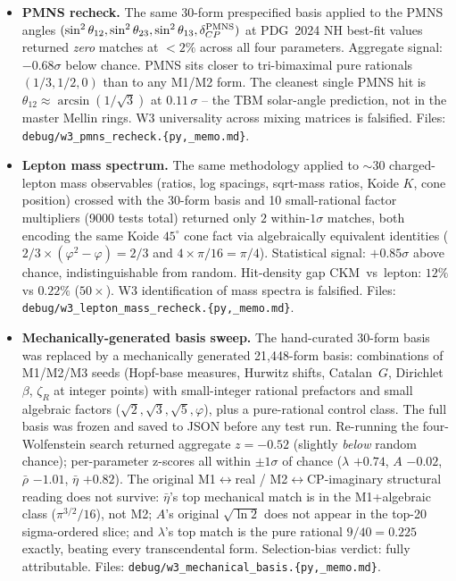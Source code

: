 \documentclass[11pt]{article}
\begin{document}
\begin{itemize}
\setlength\itemsep{2pt}
\item \textbf{PMNS recheck.}  The same 30-form prespecified basis
applied to the PMNS angles
$(\sin^2\theta_{12}, \sin^2\theta_{23}, \sin^2\theta_{13},
\delta_{CP}^{\rm PMNS})$ at PDG~2024 NH best-fit values returned
\emph{zero} matches at $<2\%$ across all four parameters.  Aggregate
signal: $-0.68\sigma$ below chance.  PMNS sits closer to tri-bimaximal
pure rationals $(1/3, 1/2, 0)$ than to any M1/M2 form.  The cleanest
single PMNS hit is $\theta_{12}\approx \arcsin(1/\sqrt{3})$ at
$0.11\,\sigma$ -- the TBM solar-angle prediction, not in the master
Mellin rings.  W3 universality across mixing matrices is falsified.
Files: \texttt{debug/w3\_pmns\_recheck.\{py,\_memo.md\}}.

\item \textbf{Lepton mass spectrum.}  The same methodology applied to
$\sim$30 charged-lepton mass observables (ratios, log spacings,
sqrt-mass ratios, Koide $K$, cone position) crossed with the 30-form
basis and 10 small-rational factor multipliers (9000 tests total)
returned only $2$ within-$1\sigma$ matches, both encoding the same
Koide $45^\circ$ cone fact via algebraically equivalent identities
($2/3 \times (\varphi^2 - \varphi) = 2/3$ and
$4 \times \pi/16 = \pi/4$).  Statistical signal: $+0.85\sigma$ above
chance, indistinguishable from random.  Hit-density gap CKM~vs~lepton:
$12\%$ vs $0.22\%$ ($50\times$).  W3 identification of mass spectra
is falsified.  Files:
\texttt{debug/w3\_lepton\_mass\_recheck.\{py,\_memo.md\}}.

\item \textbf{Mechanically-generated basis sweep.}  The hand-curated
30-form basis was replaced by a mechanically generated 21,448-form
basis: combinations of M1/M2/M3 seeds (Hopf-base measures, Hurwitz
shifts, Catalan~$G$, Dirichlet~$\beta$, $\zeta_R$ at integer points)
with small-integer rational prefactors and small algebraic factors
($\sqrt{2},\sqrt{3},\sqrt{5},\varphi$), plus a pure-rational control
class.  The full basis was frozen and saved to JSON before any test
run.  Re-running the four-Wolfenstein search returned aggregate
$z = -0.52$ (slightly \emph{below} random chance); per-parameter
z-scores all within $\pm 1\sigma$ of chance ($\lambda$ $+0.74$,
$A$ $-0.02$, $\bar\rho$ $-1.01$, $\bar\eta$ $+0.82$).  The original
M1$\leftrightarrow$real / M2$\leftrightarrow$CP-imaginary structural
reading does not survive: $\bar\eta$'s top mechanical match is in the
M1+algebraic class ($\pi^{3/2}/16$), not M2; $A$'s original
$\sqrt{\ln 2}$ does not appear in the top-20 sigma-ordered slice; and
$\lambda$'s top match is the pure rational $9/40 = 0.225$ exactly,
beating every transcendental form.  Selection-bias verdict: fully
attributable.  Files:
\texttt{debug/w3\_mechanical\_basis.\{py,\_memo.md\}}.
\end{itemize}
\end{document}
